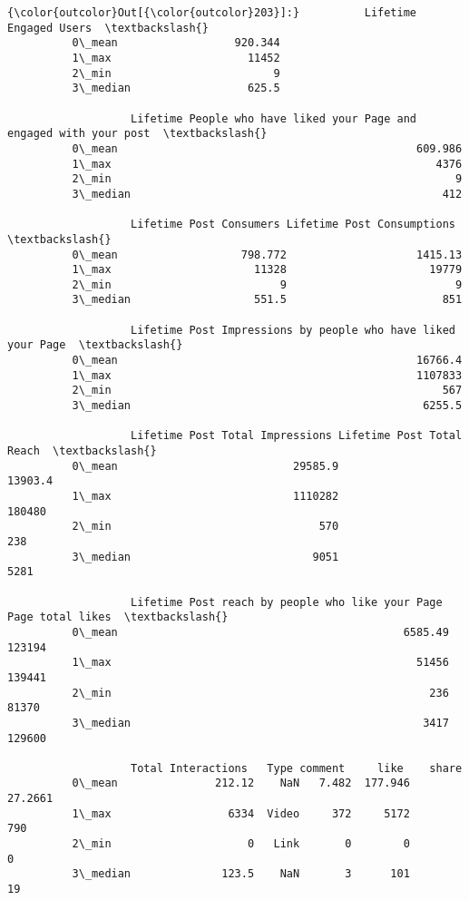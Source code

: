 \documentclass[11pt]{article}
\begin{document}
\begin{Verbatim}[commandchars=\\\{\}]
{\color{outcolor}Out[{\color{outcolor}203}]:}          Lifetime Engaged Users  \textbackslash{}
          0\_mean                  920.344   
          1\_max                     11452   
          2\_min                         9   
          3\_median                  625.5   
          
                   Lifetime People who have liked your Page and engaged with your post  \textbackslash{}
          0\_mean                                              609.986                    
          1\_max                                                  4376                    
          2\_min                                                     9                    
          3\_median                                                412                    
          
                   Lifetime Post Consumers Lifetime Post Consumptions  \textbackslash{}
          0\_mean                   798.772                    1415.13   
          1\_max                      11328                      19779   
          2\_min                          9                          9   
          3\_median                   551.5                        851   
          
                   Lifetime Post Impressions by people who have liked your Page  \textbackslash{}
          0\_mean                                              16766.4             
          1\_max                                               1107833             
          2\_min                                                   567             
          3\_median                                             6255.5             
          
                   Lifetime Post Total Impressions Lifetime Post Total Reach  \textbackslash{}
          0\_mean                           29585.9                   13903.4   
          1\_max                            1110282                    180480   
          2\_min                                570                       238   
          3\_median                            9051                      5281   
          
                   Lifetime Post reach by people who like your Page Page total likes  \textbackslash{}
          0\_mean                                            6585.49           123194   
          1\_max                                               51456           139441   
          2\_min                                                 236            81370   
          3\_median                                             3417           129600   
          
                   Total Interactions   Type comment     like    share  
          0\_mean               212.12    NaN   7.482  177.946  27.2661  
          1\_max                  6334  Video     372     5172      790  
          2\_min                     0   Link       0        0        0  
          3\_median              123.5    NaN       3      101       19  
\end{Verbatim}
            
\end{document}
